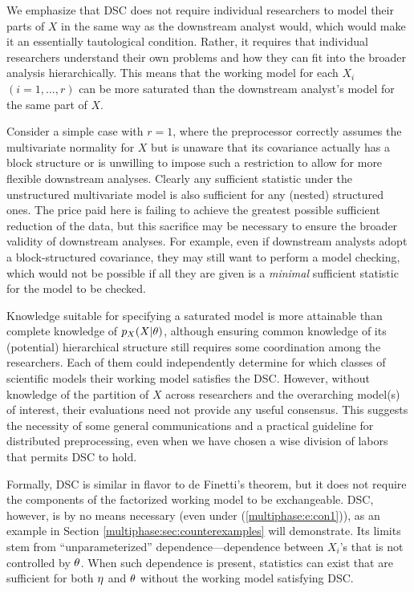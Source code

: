 %
We emphasize that DSC does not require individual researchers to model their parts of $X$ in the same way as the downstream analyst would, which would make it an essentially tautological condition.
Rather, it requires that individual  researchers understand their own problems and how they can fit into the broader analysis hierarchically.
This means that the working model for each $X_i$ $(i=1,\ldots, r)$ can be more saturated than the downstream analyst's model for the same part of $X$.

Consider a simple case with $r=1$, where  the preprocessor correctly assumes the  multivariate normality for $X$ but is unaware that its covariance actually has a block structure or is unwilling  to impose such a restriction to allow for more flexible downstream analyses. 
Clearly any sufficient statistic under the unstructured multivariate model is also sufficient for any (nested) structured ones.
The price paid here is failing to achieve the greatest possible sufficient reduction of the data, but this sacrifice may be necessary to ensure the broader validity of downstream analyses.
For example, even if  downstream analysts adopt a block-structured covariance, they  may still want to perform a model checking, which would not be possible if all they are given is a \textit{minimal}  sufficient statistic for the model to be checked.    


Knowledge suitable for specifying a saturated model is more attainable than complete knowledge of $p_X(X | \theta)$, although ensuring common knowledge of its (potential) hierarchical structure  still requires some coordination among the researchers.
Each of them could independently determine for which classes of scientific models their working model satisfies the DSC.
However, without knowledge of the partition of $X$ across researchers and the overarching model(s) of interest, their evaluations need not provide  any useful consensus.
This suggests the necessity of some general communications and a practical guideline for distributed preprocessing, even when we have chosen a wise  division of labors that permits DSC to hold.

Formally, DSC is similar in flavor to de Finetti's theorem, but it does not require the components of the factorized working model to be exchangeable. 
DSC, however, is by no means necessary (even under (\ref{multiphase:e:con1})), as an example in Section \ref{multiphase:sec:counterexamples} will demonstrate.
Its limits stem from ``unparameterized'' dependence---dependence between $X_i$'s that is not controlled by $\theta$.
When such dependence is present, statistics can exist that are sufficient for both $\eta$ and $\theta$ without the working model satisfying DSC.

